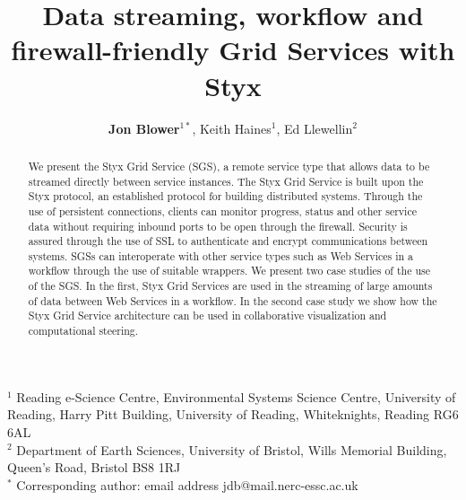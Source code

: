 \documentclass[a4paper]{article}
\begin{document}
\title{Data streaming, workflow and firewall-friendly Grid Services with Styx}

\author{\textbf{Jon Blower$^{1*}$}, Keith Haines$^{1}$, Ed Llewellin$^{2}$}
\date{}

\maketitle

\begin{center}
$^{1}$ Reading e-Science Centre, Environmental Systems Science Centre, University of Reading, Harry 
Pitt Building, University of Reading, Whiteknights, Reading RG6 6AL \\
$^{2}$ Department of Earth Sciences, University of Bristol, Wills Memorial Building, Queen's Road, Bristol BS8 1RJ \\
\medskip
$^{*}$ Corresponding author: email address jdb@mail.nerc-essc.ac.uk
\end{center}

\bigskip

\begin{abstract}
We present the Styx Grid Service (SGS), a remote service type that allows data to be streamed directly between service instances.  The Styx Grid Service is built upon the Styx protocol, an established protocol for building distributed systems.  Through the use of persistent connections, clients can monitor progress, status and other service data without requiring inbound ports to be open through the firewall.  Security is assured through the use of SSL to authenticate and encrypt communications between systems.  SGSs can interoperate with other service types such as Web Services in a workflow through the use of suitable wrappers. We present two case studies of the use of the SGS. In the first, Styx Grid Services are used in the streaming of large amounts of data between Web Services in a workflow.  In the second case study we show how the Styx Grid Service architecture can be used in collaborative visualization and computational steering.
\end{abstract}

\bigskip
\end{document}
